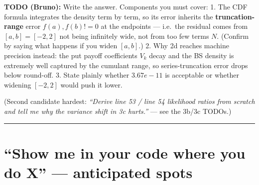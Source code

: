 \documentclass[
  11pt,
]{article}
\begin{document}
\textbf{TODO (Bruno):} Write the answer. Components you must cover: 1.
The CDF formula integrates the density term by term, so its error
inherits the \textbf{truncation-range} error \(f(a), f(b) != 0\) at the
endpoints --- i.e.~the residual comes from \([a,b]=[-2,2]\) not being
infinitely wide, not from too few terms \(N\). (Confirm by saying what
happens if you widen \([a,b]\).) 2. Why 2d reaches machine precision
instead: the put payoff coefficients \(V_k\) decay and the BS density is
extremely well captured by the cumulant range, so series-truncation
error drops below round-off. 3. State plainly whether \(3.67e-11\) is
acceptable or whether widening \([-2,2]\) would push it lower.

(Second candidate hardest: \emph{``Derive line 53 / line 54 likelihood
ratios from scratch and tell me why the variance shift in 3c hurts.''}
--- see the 3b/3c TODOs.)

\begin{center}\rule{0.5\linewidth}{0.5pt}\end{center}

\hypertarget{show-me-in-your-code-where-you-do-x-anticipated-spots}{%
\section{``Show me in your code where you do X'' --- anticipated
spots}\label{show-me-in-your-code-where-you-do-x-anticipated-spots}}
\end{document}
